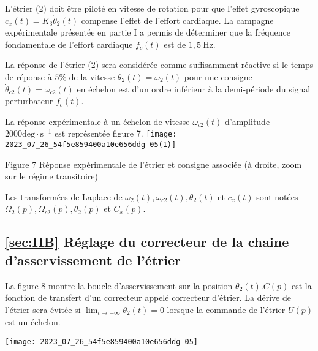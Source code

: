 L'étrier (2) doit être piloté en vitesse de rotation pour que l'effet gyroscopique $c_{x}(t)=K_{3} \dot{\theta}_{2}(t)$ compense l'effet de l'effort cardiaque. La campagne expérimentale présentée en partie I a permis de déterminer que la fréquence fondamentale de l'effort cardiaque $f_{c}(t)$ est de $1,5 \mathrm{~Hz}$.

La réponse de l'étrier (2) sera considérée comme suffisamment réactive si le temps de réponse à $5 \%$ de la vitesse $\dot{\theta}_{2}(t)=\omega_{2}(t)$ pour une consigne $\dot{\theta}_{c 2}(t)=\omega_{c 2}(t)$ en échelon est d'un ordre inférieur à la demi-période du signal perturbateur $f_{c}(t)$.

La réponse expérimentale à un échelon de vitesse $\omega_{c 2}(t)$ d'amplitude $2000 \mathrm{deg} \cdot \mathrm{s}^{-1}$ est représentée figure 7.
\texttt{[image: 2023\_07\_26\_54f5e859400a10e656ddg-05(1)]}

Figure 7 Réponse expérimentale de l'étrier et consigne associée (à droite, zoom sur le régime transitoire)

Les transformées de Laplace de $\omega_{2}(t), \omega_{c 2}(t), \theta_{2}(t)$ et $c_{x}(t)$ sont notées $\Omega_{2}(p), \Omega_{c 2}(p), \theta_{2}(p)$ et $C_{x}(p)$.


\subsection{\ref{sec:IIB} Réglage du correcteur de la chaine d'asservissement de l'étrier}
La figure 8 montre la boucle d'asservissement sur la position $\theta_{2}(t) . C(p)$ est la fonction de transfert d'un correcteur appelé correcteur d'étrier. La dérive de l'étrier sera évitée si $\lim _{t \rightarrow+\infty} \theta_{2}(t)=0$ lorsque la commande de l'étrier $U(p)$ est un échelon.

\begin{center}
\texttt{[image: 2023\_07\_26\_54f5e859400a10e656ddg-05]}
\end{center}

